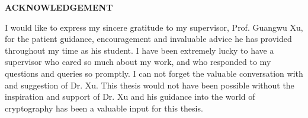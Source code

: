 \begin{center}
    {\textbf{\Large{\MakeUppercase{Acknowledgement}}}}
\end{center}

I would like to express my sincere gratitude to my supervisor, Prof. Guangwu Xu, for the patient guidance, encouragement and invaluable advice he has provided throughout my time as his student. I have been extremely lucky to have a supervisor who cared so much about my work, and who responded to my questions and queries so promptly. I can not forget the valuable conversation with and suggestion of Dr. Xu. This thesis would not have been possible without the inspiration and support of Dr. Xu and his guidance into the world of cryptography has been a valuable input for this thesis.

\newpage
